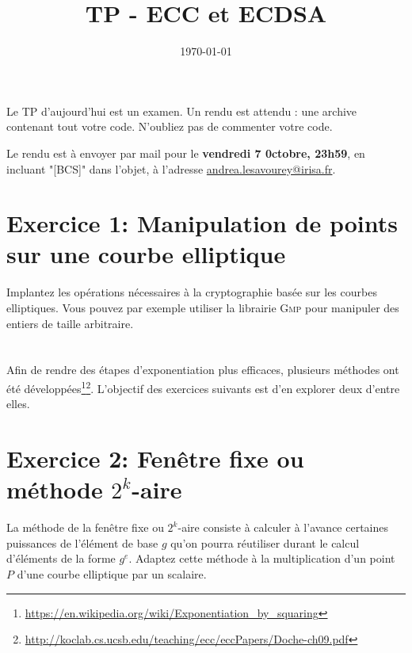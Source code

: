 \documentclass[french,a4paper,11pt]{exam}
\title{\textbf{TP - ECC et ECDSA}}
\date{\today}
\begin{document}
\maketitle

Le TP d'aujourd'hui est un examen. Un rendu est attendu : une archive contenant tout
votre code. N'oubliez pas de commenter votre code.

Le rendu est à envoyer par mail pour le \textbf{vendredi 7 0ctobre, 23h59}, en incluant "[BCS]" dans l'objet, à l'adresse \url{andrea.lesavourey@irisa.fr}. 

\begin{center}
\end{center}


\section*{Exercice 1: Manipulation de points sur une courbe elliptique}
Implantez les opérations nécessaires à la cryptographie basée sur les
courbes elliptiques. Vous pouvez par exemple utiliser la librairie
\textsc{Gmp} pour manipuler des entiers de taille arbitraire. 

\vspace{-.5cm}
\section*{}
 Afin de rendre des étapes d'exponentiation plus efficaces, plusieurs
méthodes ont été développées\footnote{\url{https://en.wikipedia.org/wiki/Exponentiation_by_squaring}}\footnote{\url{http://koclab.cs.ucsb.edu/teaching/ecc/eccPapers/Doche-ch09.pdf}}. L'objectif des exercices suivants est d'en explorer deux
d'entre elles.



\section*{Exercice 2: Fenêtre fixe ou méthode \(2^k\)-aire}
La méthode de la fenêtre fixe ou \(2^k\)-aire consiste à calculer à l'avance
certaines puissances de l'élément de base \(g\) qu'on pourra réutiliser durant le
calcul d'éléments de la forme \(g^e\). Adaptez cette méthode à la multiplication d'un
point \(P\) d'une courbe elliptique par un scalaire. \\
\end{document}

